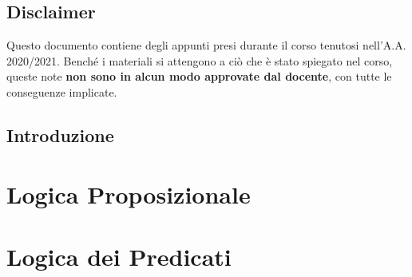 \documentclass[12pt, a4paper,titlepage]{book}
\theoremstyle{plain}%
\theoremstyle{definition}
\begin{document}
\chapter*{Disclaimer}
Questo documento contiene degli appunti presi durante il corso tenutosi 
nell'A.A. 2020/2021. Benché i materiali si attengono a ciò che è stato 
spiegato nel corso, queste note \textbf{non sono in alcun modo approvate 
dal docente}, con tutte le conseguenze implicate.

\chapter{Introduzione}

\cleardoublepage

\part{Logica Proposizionale}




\cleardoublepage

\part{Logica dei Predicati}



\backmatter 
\end{document}
